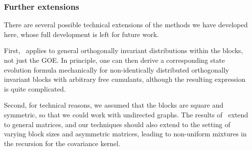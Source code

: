 \subsubsection{Further extensions}

There are several possible technical extensions of the methods we have developed here,
whose full development is left for future work.

First,~ applies to general orthogonally invariant distributions within the blocks, not just the GOE. In principle, one can then derive a corresponding state evolution formula mechanically for non-identically distributed orthogonally invariant blocks with arbitrary free cumulants, although the resulting expression is quite complicated.

Second, for technical reasons, we assumed that the blocks are square and symmetric, so that we could work with undirected graphs. The results of~\cite{male2020traffic,cebron2024traffic} extend to general matrices, and our techniques should also extend to the setting of varying block sizes and asymmetric matrices, leading to non-uniform mixtures in the recursion for the covariance kernel.

